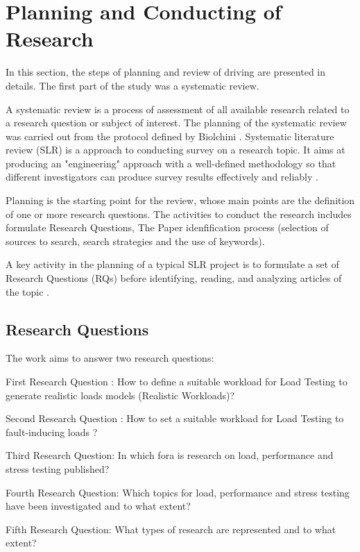 \section{Planning and Conducting of Research}

In this section, the steps of planning and review of driving are presented in details. The first part of the study was a systematic review. 

A systematic review is a process of assessment of all available research related to a research question or subject of interest. The planning of the systematic review was carried out from the protocol defined by Biolchini \cite{Biolchini2005} \cite{Afzal2009}. Systematic literature review (SLR) is a approach to conducting survey on a research topic. It aims at producing an "engineering" approach with a well-defined methodology so that different investigators can produce survey results effectively and reliably \cite{Kitchenham2007}.


Planning is the starting point for the review, whose main points are the definition of one or more research questions. The activities to conduct the research  includes formulate Research Questions,  The Paper idenfification process (selection of sources to search, search strategies and the use of keywords). 

A  key activity in the planning  of a typical SLR project  is to formulate a set of Research Questions (RQs) before identifying, reading, and analyzing articles of the topic \cite{Jamshidi2013}. 


\subsection{Research Questions}

The work aims to answer two research questions:

First Research Question : How to define a suitable workload for Load Testing to generate realistic loads models (Realistic Workloads)?

Second  Research Question : How to set a suitable workload for Load Testing to fault-inducing loads ?

Third Research Question: In which fora is research on load, performance and stress testing published? 

Fourth Research Question: Which topics for load, performance and stress testing  have been investigated and to what extent?

Fifth Research Question: What types of research are represented and to what extent? 

